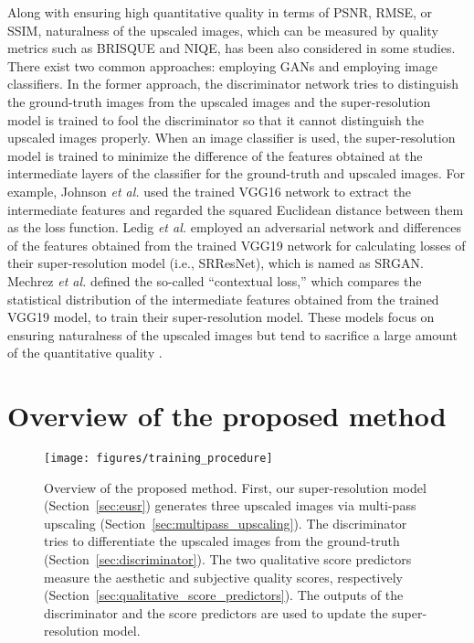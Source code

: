 \documentclass[runningheads]{llncs}
\begin{document}
Along with ensuring high quantitative quality in terms of PSNR, RMSE, or SSIM, naturalness of the upscaled images, which can be measured by quality metrics such as BRISQUE and NIQE, has been also considered in some studies.
There exist two common approaches: employing GANs \cite{goodfellow2014generative} and employing image classifiers.
In the former approach, the discriminator network tries to distinguish the ground-truth images from the upscaled images and the super-resolution model is trained to fool the discriminator so that it cannot distinguish the upscaled images properly.
When an image classifier is used, the super-resolution model is trained to minimize the difference of the features obtained at the intermediate layers of the classifier for the ground-truth and upscaled images.
For example, Johnson \textit{et al.} \cite{johnson2016perceptual} used the trained VGG16 network to extract the intermediate features and regarded the squared Euclidean distance between them as the loss function.
Ledig \textit{et al.} \cite{ledig2017photo} employed an adversarial network and differences of the features obtained from the trained VGG19 network for calculating losses of their super-resolution model (i.e., SRResNet), which is named as SRGAN.
Mechrez \textit{et al.} \cite{mechrez2018learning} defined the so-called ``contextual loss,'' which compares the statistical distribution of the intermediate features obtained from the trained VGG19 model, to train their super-resolution model.
These models focus on ensuring naturalness of the upscaled images but tend to sacrifice a large amount of the quantitative quality \cite{blau2017perception}.


\section{Overview of the proposed method}
\label{sec:method}

\begin{figure}[t]
	\centering
	\texttt{[image: figures/training\_procedure]}
	\caption{Overview of the proposed method. First, our super-resolution model (Section~\ref{sec:eusr}) generates three upscaled images via multi-pass upscaling (Section~\ref{sec:multipass_upscaling}). The discriminator tries to differentiate the upscaled images from the ground-truth (Section~\ref{sec:discriminator}). The two qualitative score predictors measure the aesthetic and subjective quality scores, respectively (Section~\ref{sec:qualitative_score_predictors}). The outputs of the discriminator and the score predictors are used to update the super-resolution model.}
	\label{fig:method_procedure}
\end{figure}
\end{document}
